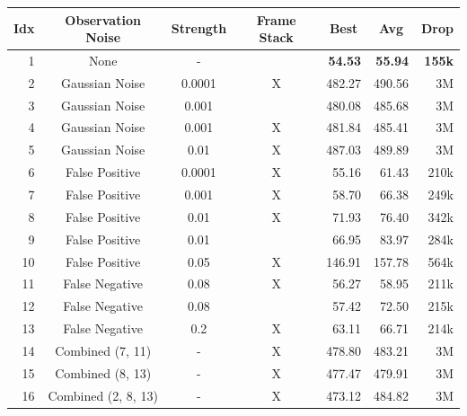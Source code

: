 \begin{table}[ht!]
    \begin{center}
        \begin{tabular}{rcccrrr}
            \toprule
            \multicolumn{1}{c}{Idx} & \multicolumn{1}{c}{Observation Noise} & \multicolumn{1}{c}{Strength} & \multicolumn{1}{c}{Frame Stack} & \multicolumn{1}{c}{Best} & \multicolumn{1}{c}{Avg} & \multicolumn{1}{c}{Drop}\\
            \midrule
            1 & None & - &  & \textbf{54.53} & \textbf{55.94} & \textbf{155k} \\
            \midrule
            2 & Gaussian Noise & 0.0001 & X & 482.27 & 490.56 & 3M \\
            3 & Gaussian Noise & 0.001 &  & 480.08 & 485.68 & 3M \\
            4 & Gaussian Noise & 0.001 & X & 481.84 & 485.41 & 3M \\
            5 & Gaussian Noise & 0.01 & X & 487.03 & 489.89 & 3M \\
            6 & False Positive & 0.0001 & X & 55.16 & 61.43 & 210k \\
            7 & False Positive & 0.001 & X & 58.70 & 66.38 & 249k \\
            8 & False Positive & 0.01 & X & 71.93 & 76.40 & 342k \\
            9 & False Positive & 0.01 &  & 66.95 & 83.97 & 284k \\
            10 & False Positive & 0.05 & X & 146.91 & 157.78 & 564k \\
            11 & False Negative & 0.08 & X & 56.27 & 58.95 & 211k \\
            12 & False Negative & 0.08 &  & 57.42 & 72.50 & 215k \\
            13 & False Negative & 0.2 & X & 63.11 & 66.71 & 214k \\
            \midrule
            14 & Combined (7, 11) & - & X & 478.80 & 483.21 & 3M \\
            15 & Combined (8, 13) & - & X & 477.47 & 479.91 & 3M \\
            16 & Combined (2, 8, 13) & - & X & 473.12 & 484.82 & 3M \\
            \bottomrule
        \end{tabular}
    \end{center}

\end{table}
